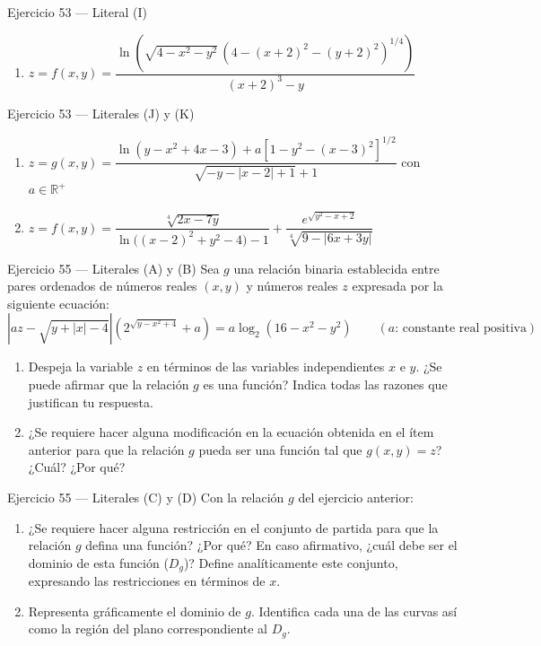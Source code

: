 \documentclass[aspectratio=169,10pt]{beamer}
\begin{document}
\begin{frame}{Ejercicio 53 — Literal (I)}
  \small
  \begin{enumerate}
    \item[(I)] $z = f(x,y) = \dfrac{\ln\!\left(\sqrt{4 - x^2 - y^2}\,(4 - (x+2)^2 - (y+2)^2)^{1/4}\right)}{(x+2)^3 - y}$
  \end{enumerate}
  \vfill
\end{frame}

\begin{frame}{Ejercicio 53 — Literales (J) y (K)}
  \small
  \begin{enumerate}
    \item[(J)] $z = g(x,y) = \dfrac{\ln(y - x^2 + 4x - 3) + a\left[1 - y^2 - (x-3)^2\right]^{1/2}}{\sqrt{-y - |x-2| + 1} + 1}$ \quad con $a \in \mathbb{R}^+$
    \vspace{2.6cm}
    \item[(K)] $z = f(x,y) = \dfrac{\sqrt[4]{2x - 7y}}{\ln\big((x-2)^2 + y^2 - 4\big) - 1} + \dfrac{e^{\sqrt{y^2 - x + 2}}}{\sqrt[4]{9 - |6x + 3y|}}$
  \end{enumerate}
  \vfill
\end{frame}

\begin{frame}{Ejercicio 55 — Literales (A) y (B)}
  \small
  Sea $g$ una relación binaria establecida entre pares ordenados de números reales $(x,y)$ y números reales $z$ expresada por la siguiente ecuación:
  \[
    \left|az - \sqrt{y + |x| - 4}\right|\left(2^{\sqrt{y - x^2 + 4}} + a\right) = a\log_2(16 - x^2 - y^2) \qquad (a\text{: constante real positiva})
  \]
  \begin{enumerate}
    \item[(A)] Despeja la variable $z$ en términos de las variables independientes $x$ e $y$. ¿Se puede afirmar que la relación $g$ es una función? Indica todas las razones que justifican tu respuesta.
    \item[(B)] ¿Se requiere hacer alguna modificación en la ecuación obtenida en el ítem anterior para que la relación $g$ pueda ser una función tal que $g(x,y) = z$? ¿Cuál? ¿Por qué?
  \end{enumerate}
  \vfill
\end{frame}

\begin{frame}{Ejercicio 55 — Literales (C) y (D)}
  \small
  Con la relación $g$ del ejercicio anterior:
  \begin{enumerate}
    \item[(C)] ¿Se requiere hacer alguna restricción en el conjunto de partida para que la relación $g$ defina una función? ¿Por qué? En caso afirmativo, ¿cuál debe ser el dominio de esta función ($D_g$)? Define analíticamente este conjunto, expresando las restricciones en términos de $x$.
    \item[(D)] Representa gráficamente el dominio de $g$. Identifica cada una de las curvas así como la región del plano correspondiente al $D_g$.
  \end{enumerate}
  \vfill
\end{frame}
\end{document}

